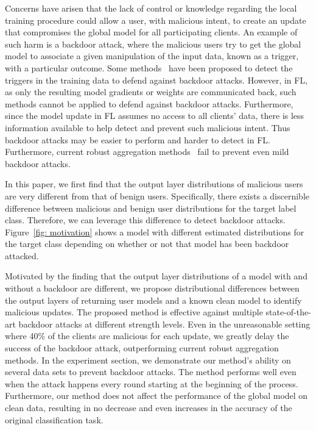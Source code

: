 \documentclass{article} %
\begin{document}
Concerns have arisen that the lack of control or knowledge regarding the local training procedure could allow a user, with malicious intent, to create an update that compromises the global model for all participating clients. An example of such harm is a backdoor attack,  where the malicious users try to get the global model to associate a given manipulation of the input data, known as a trigger, with a particular outcome. Some methods~\cite{kurita2020weight,qi2020onion,li2021backdoor} have been proposed to detect the triggers in the training data to defend against backdoor attacks. However, in FL, as only the resulting model gradients or weights are communicated back, such methods cannot be applied to defend against backdoor attacks. Furthermore, since the model update in FL assumes no access to all clients' data, there is less information available to help detect and prevent such malicious intent. Thus backdoor attacks may be easier to perform and harder to detect in FL.  Furthermore, current robust aggregation methods~\cite{trim-mean} fail to prevent even mild backdoor attacks.

In this paper, we first find that the output layer distributions of malicious users are very different from that of benign users. Specifically, there exists a discernible difference between malicious and benign user distributions for the target label class. Therefore, we can leverage this difference to detect backdoor attacks. Figure~\ref{fig: motivation} shows a model with different estimated distributions for the target class depending on whether or not that model has been backdoor attacked. 

Motivated by the finding that the output layer distributions of a model with and without a backdoor are different, we propose distributional differences between the output layers of returning user models and a known clean model to identify malicious updates. The proposed method is effective against multiple state-of-the-art backdoor attacks at different strength levels. Even in the unreasonable setting where 40\% of the clients are malicious for each update, we greatly delay the success of the backdoor attack, outperforming current robust aggregation methods.  In the experiment section, we demonstrate our method's ability on several data sets to prevent backdoor attacks.  The method performs well even when the attack happens every round starting at the beginning of the process. Furthermore, our method does not affect the performance of the global model on clean data, resulting in no decrease and even increases in the accuracy of the original classification task.
\end{document}
